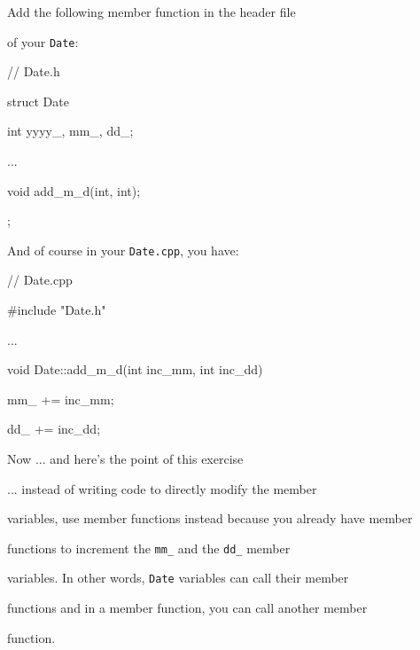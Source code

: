 Add the following member function in the header file

of your \texttt{Date}:



\begin{consolethree}[escapeinside=||]

// Date.h

struct Date

{

    int yyyy_, mm_, dd_;

    ...

    void add_m_d(int, int);

};

\end{consolethree}



And of course in your \texttt{Date.cpp}, you have:



\begin{consolethree}[escapeinside=||]

// Date.cpp

#include "Date.h"

...

void Date::add_m_d(int inc_mm, int inc_dd)

{

    mm_ += inc_mm;

    dd_ += inc_dd;

}

\end{consolethree}



Now ... and here's the point of this exercise

... instead of writing code to directly modify the member

variables, use member functions instead because you already have member

functions to increment the \texttt{mm\_} and the \texttt{dd\_} member

variables. In other words, \texttt{Date} variables can call their member

functions and in a member function, you can call another member

function.

